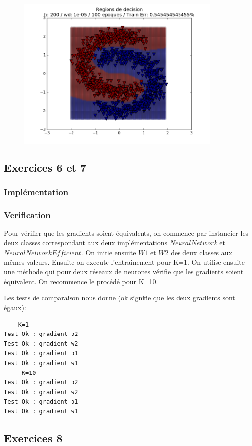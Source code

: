 \documentclass[a4paper,11pt]{article}
\begin{document}
\begin{figure}[H]
	\includegraphics[width=10cm]{images/exo5-under1.png}
	\centering
	\label{fig:comp}
\end{figure}



\subsection{Exercices 6 et 7	}
\subsubsection{Implémentation}
\subsubsection{Verification}
Pour vérifier que les gradients soient équivalents, on commence par instancier les deux classes correspondant aux deux implémentations $NeuralNetwork$ et $NeuralNetworkEfficient$. On initie ensuite $W1$ et $W2$ des deux classes aux mêmes valeurs. Ensuite on execute l'entrainement pour K=1. On utilise ensuite une méthode qui pour deux réseaux de neurones vérifie que les gradients soient équivalent. On recommence le procédé pour K=10.

Les tests de comparaison nous donne (ok signifie que les deux gradients sont égaux):

\begin{verbatim}
--- K=1 ---
Test Ok : gradient b2
Test Ok : gradient w2
Test Ok : gradient b1
Test Ok : gradient w1
 --- K=10 ---
Test Ok : gradient b2
Test Ok : gradient w2
Test Ok : gradient b1
Test Ok : gradient w1
\end{verbatim}


\subsection{Exercices 8}
\end{document}
